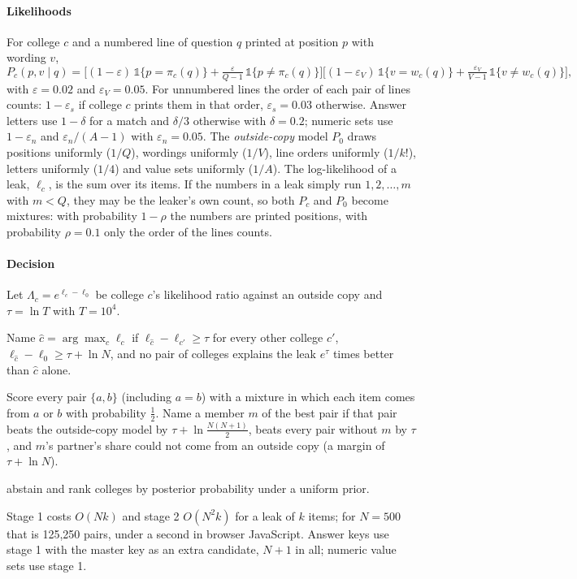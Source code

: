 \documentclass[10pt,a4paper]{article}
\theoremstyle{remark}
\begin{document}
\paragraph{Likelihoods} For college $c$ and a numbered line of question $q$ printed at position $p$ with wording $v$,
\begin{equation}
P_c(p,v\mid q)=\Big[(1-\varepsilon)\,\mathbb{1}\{p=\pi_c(q)\}+\tfrac{\varepsilon}{Q-1}\,\mathbb{1}\{p\ne\pi_c(q)\}\Big]\Big[(1-\varepsilon_V)\,\mathbb{1}\{v=w_c(q)\}+\tfrac{\varepsilon_V}{V-1}\,\mathbb{1}\{v\ne w_c(q)\}\Big],
\end{equation}
with $\varepsilon=0.02$ and $\varepsilon_V=0.05$. For unnumbered lines the order of each pair of lines counts: $1-\varepsilon_s$ if college $c$ prints them in that order, $\varepsilon_s=0.03$ otherwise. Answer letters use $1-\delta$ for a match and $\delta/3$ otherwise with $\delta=0.2$; numeric sets use $1-\varepsilon_n$ and $\varepsilon_n/(A-1)$ with $\varepsilon_n=0.05$. The \emph{outside-copy} model $P_0$ draws positions uniformly ($1/Q$), wordings uniformly ($1/V$), line orders uniformly ($1/k!$), letters uniformly ($1/4$) and value sets uniformly ($1/A$). The log-likelihood of a leak, $\ell_c$, is the sum over its items. If the numbers in a leak simply run $1,2,\dots,m$ with $m<Q$, they may be the leaker's own count, so both $P_c$ and $P_0$ become mixtures: with probability $1-\rho$ the numbers are printed positions, with probability $\rho=0.1$ only the order of the lines counts.

\paragraph{Decision} Let $\Lambda_c=e^{\ell_c-\ell_0}$ be college $c$'s likelihood ratio against an outside copy and $\tau=\ln T$ with $T=10^4$.
\begin{description}[leftmargin=1.2em,font=\normalfont\sffamily\bfseries\small]
\item[Stage 1, one source.] Name $\hat c=\arg\max_c\ell_c$ if $\ell_{\hat c}-\ell_{c'}\ge\tau$ for every other college $c'$, $\ell_{\hat c}-\ell_0\ge\tau+\ln N$, and no pair of colleges explains the leak $e^{\tau}$ times better than $\hat c$ alone.
\item[Stage 2, two sources.] Score every pair $\{a,b\}$ (including $a=b$) with a mixture in which each item comes from $a$ or $b$ with probability $\tfrac12$. Name a member $m$ of the best pair if that pair beats the outside-copy model by $\tau+\ln\tfrac{N(N+1)}{2}$, beats every pair without $m$ by $\tau$, and $m$'s partner's share could not come from an outside copy (a margin of $\tau+\ln N$).
\item[Otherwise] abstain and rank colleges by posterior probability under a uniform prior.
\end{description}
Stage 1 costs $O(Nk)$ and stage 2 $O(N^2k)$ for a leak of $k$ items; for $N=500$ that is 125{,}250 pairs, under a second in browser JavaScript. Answer keys use stage 1 with the master key as an extra candidate, $N+1$ in all; numeric value sets use stage 1.
\end{document}
